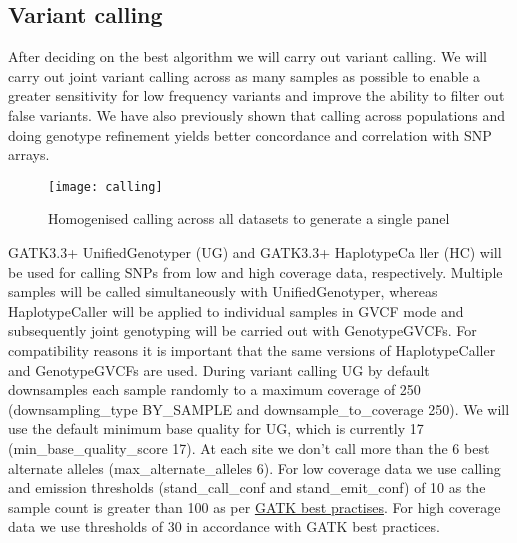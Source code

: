 \subsection{Variant calling}
After deciding on the best algorithm we will carry out variant calling. We will carry out joint variant calling across as many samples as possible to enable a greater sensitivity for low frequency variants and improve the ability to filter out false variants. We have also previously shown that calling across populations and doing genotype refinement yields better concordance and correlation with SNP arrays.

\begin{figure}[!htbp]
\centering
\texttt{[image: calling]}
\caption{Homogenised calling across all datasets to generate a single panel}
\label{fig:calling}
\end{figure}
GATK3.3+ UnifiedGenotyper (UG) and GATK3.3+ HaplotypeCa ller (HC) will be used for calling SNPs from low and high coverage data, respectively. Multiple samples will be called simultaneously with UnifiedGenotyper, whereas HaplotypeCaller will be applied to individual samples in GVCF mode and subsequently joint genotyping will be carried out with GenotypeGVCFs. For compatibility reasons it is important that the same versions of HaplotypeCaller and GenotypeGVCFs are used.
During variant calling UG by default downsamples each sample randomly to a maximum coverage of 250 (\-\-downsampling\_type BY\_SAMPLE and \-\-downsample\_to\_coverage 250). We will use the default minimum base quality for UG, which is currently 17 (\-\-min\_base\_quality\_score 17). %
At each site we don't call more than the 6 best alternate alleles (\-\-max\_alternate\_alleles 6).
For low coverage data we use calling and emission thresholds (\-stand\_call\_conf and \-stand\_emit\_conf) of 10 as the sample count is greater than 100 as per \href{https://www.broadinstitute.org/gatk/guide/pdfdocs/GATK_GuideBook_2.7-4.pdf}{GATK best practises}. %
For high coverage data we use thresholds of 30 in accordance with GATK best practices.


